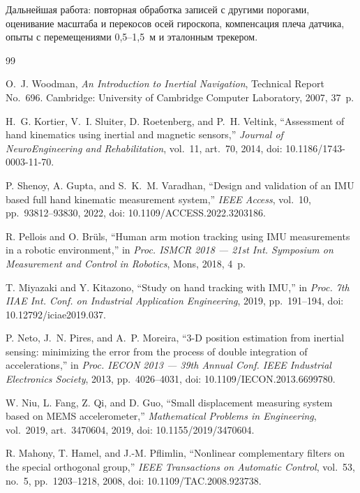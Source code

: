 \documentclass{misisarticle}
\begin{document}
Дальнейшая работа: повторная обработка записей с другими порогами, оценивание масштаба и перекосов осей гироскопа, компенсация плеча датчика, опыты с перемещениями 0,5--1,5~м и эталонным трекером.

\begin{thebibliography}{99}

 O.~J. Woodman, \textit{An Introduction to Inertial Navigation}, Technical Report No.~696. Cambridge: University of Cambridge Computer Laboratory, 2007, 37~p.

 H.~G. Kortier, V.~I. Sluiter, D. Roetenberg, and P.~H. Veltink, ``Assessment of hand kinematics using inertial and magnetic sensors,'' \textit{Journal of NeuroEngineering and Rehabilitation}, vol.~11, art.~70, 2014, doi: 10.1186/1743-0003-11-70.

 P. Shenoy, A. Gupta, and S.~K.~M. Varadhan, ``Design and validation of an IMU based full hand kinematic measurement system,'' \textit{IEEE Access}, vol.~10, pp.~93812--93830, 2022, doi: 10.1109/ACCESS.2022.3203186.

 R. Pellois and O. Brüls, ``Human arm motion tracking using IMU measurements in a robotic environment,'' in \textit{Proc. ISMCR 2018 --- 21st Int. Symposium on Measurement and Control in Robotics}, Mons, 2018, 4~p.

 T. Miyazaki and Y. Kitazono, ``Study on hand tracking with IMU,'' in \textit{Proc. 7th IIAE Int. Conf. on Industrial Application Engineering}, 2019, pp.~191--194, doi: 10.12792/iciae2019.037.

 P. Neto, J.~N. Pires, and A.~P. Moreira, ``3-D position estimation from inertial sensing: minimizing the error from the process of double integration of accelerations,'' in \textit{Proc. IECON 2013 --- 39th Annual Conf. IEEE Industrial Electronics Society}, 2013, pp.~4026--4031, doi: 10.1109/IECON.2013.6699780.

 W. Niu, L. Fang, Z. Qi, and D. Guo, ``Small displacement measuring system based on MEMS accelerometer,'' \textit{Mathematical Problems in Engineering}, vol.~2019, art.~3470604, 2019, doi: 10.1155/2019/3470604.

 R. Mahony, T. Hamel, and J.-M. Pflimlin, ``Nonlinear complementary filters on the special orthogonal group,'' \textit{IEEE Transactions on Automatic Control}, vol.~53, no.~5, pp.~1203--1218, 2008, doi: 10.1109/TAC.2008.923738.


\end{thebibliography}
\end{document}

